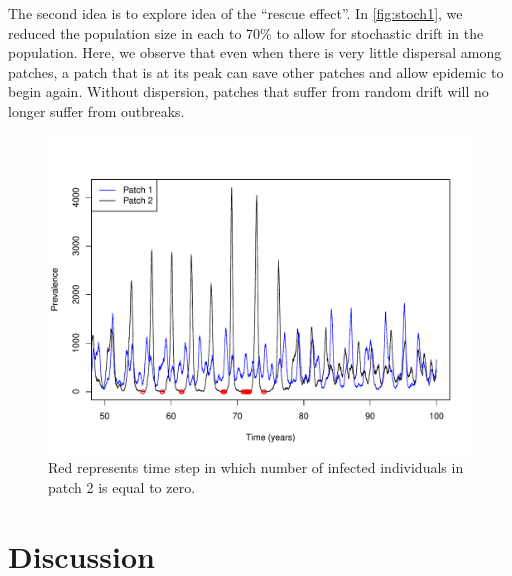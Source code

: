 \documentclass[12pt]{article}
\begin{document}
The second idea is to explore idea of the ``rescue effect''. In \autoref{fig:stoch1}, we reduced the population size in each to 70\% to allow for stochastic drift in the population. Here, we observe that even when there is very little dispersal among patches, a patch that is at its peak can save other patches and allow epidemic to begin again. Without dispersion, patches that suffer from random drift will no longer suffer from outbreaks.

\begin{figure}
\centering
\includegraphics[width=.65\linewidth]{stochfig/stochastic2.pdf} 
\caption[???]{Red represents time step in which number of infected individuals in patch 2 is equal to zero.}\label{fig:stoch2}
\end{figure}


\section{Discussion}
\label{sec:discussion}



\end{document}
